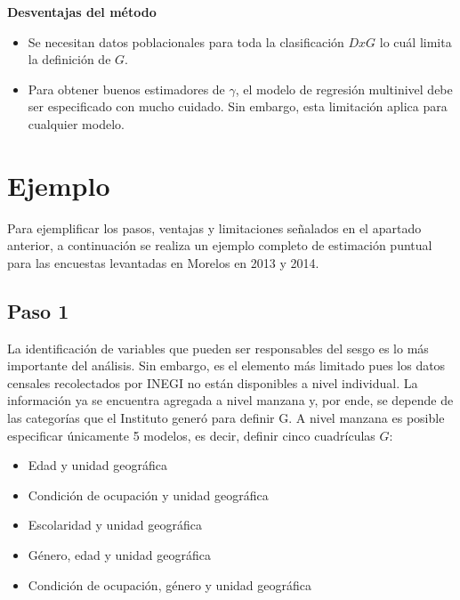 \documentclass[]{article}
\begin{document}
\textbf{Desventajas del método}

\begin{itemize}
\itemsep1pt\parskip0pt
\item
  Se necesitan datos poblacionales para toda la clasificación $DxG$ lo
  cuál limita la definición de $G$.
\item
  Para obtener buenos estimadores de $\gamma$, el modelo de regresión
  multinivel debe ser especificado con mucho cuidado. Sin embargo, esta
  limitación aplica para cualquier modelo.
\end{itemize}

\pagebreak

\section{Ejemplo}\label{ejemplo}

Para ejemplificar los pasos, ventajas y limitaciones señalados en el
apartado anterior, a continuación se realiza un ejemplo completo de
estimación puntual para las encuestas levantadas en Morelos en 2013 y
2014.

\subsection{Paso 1}\label{paso-1}

La identificación de variables que pueden ser responsables del sesgo es
lo más importante del análisis. Sin embargo, es el elemento más limitado
pues los datos censales recolectados por INEGI no están disponibles a
nivel individual. La información ya se encuentra agregada a nivel
manzana y, por ende, se depende de las categorías que el Instituto
generó para definir G. A nivel manzana es posible especificar únicamente
5 modelos, es decir, definir cinco cuadrículas $G$:

\begin{itemize}
\itemsep1pt\parskip0pt
\item
  Edad y unidad geográfica
\item
  Condición de ocupación y unidad geográfica
\item
  Escolaridad y unidad geográfica
\item
  Género, edad y unidad geográfica
\item
  Condición de ocupación, género y unidad geográfica
\end{itemize}
\end{document}
